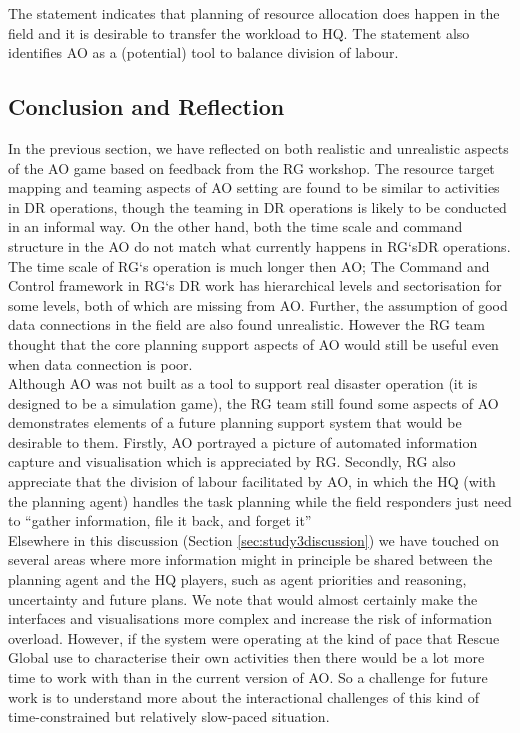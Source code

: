 The statement indicates that planning of resource allocation does happen in the field and it is desirable to transfer the workload to HQ. The statement also identifies \ac{AO} as a (potential) tool to balance division of labour. \\


\subsection{Conclusion and Reflection}
In the previous section, we have reflected on both realistic and unrealistic aspects of the \ac{AO} game based on feedback from the \ac{RG} workshop. The resource target mapping and teaming aspects of \ac{AO} setting are found to be similar to activities in \ac{DR} operations, though the teaming in DR operations is likely to be conducted in an informal way. On the other hand, both the time scale and command structure in the \ac{AO} do not match what currently happens in \ac{RG}`s\ac{DR} operations. The time scale of \ac{RG}`s operation is much longer then \ac{AO}; The Command and Control framework in \ac{RG}`s \ac{DR} work has hierarchical levels and sectorisation for some levels, both of which are missing from \ac{AO}. Further, the assumption of good data connections in the field are also found unrealistic. However the \ac{RG} team thought that the core planning support aspects of \ac{AO} would still be useful even when data connection is poor. \\

Although \ac{AO} was not built as a tool to support real disaster operation (it is designed to be a simulation game), the \ac{RG} team still found some aspects of \ac{AO} demonstrates elements of a future planning support system that would be desirable to them. Firstly, \ac{AO} portrayed a picture of automated information capture and visualisation which is appreciated by \ac{RG}. Secondly, \ac{RG} also appreciate that the division of labour facilitated by \ac{AO}, in which the HQ (with the planning agent) handles the task planning while the field responders just need to ``gather information, file it back, and forget it''\\

Elsewhere in this discussion (Section \ref{sec:study3discussion}) we have touched on several areas where more information might in principle be shared between the planning agent and the HQ players, such as agent priorities and reasoning, uncertainty and future plans. We note that would almost certainly make the interfaces and visualisations more complex and increase the risk of information overload. However, if the system were operating at the kind of pace that Rescue Global use to characterise their own activities then there would be a lot more time to work with than in the current version of \ac{AO}. So a challenge for future work is to understand more about the interactional challenges of this kind of time-constrained but relatively slow-paced situation.\\

